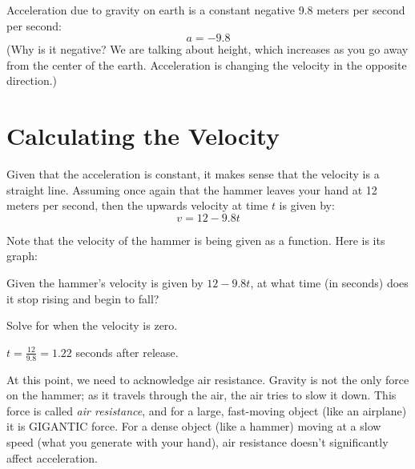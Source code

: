 Acceleration due to gravity on earth is a constant negative 9.8 meters per second per second:
\begin{equation*}
a = -9.8   
\end{equation*}
(Why is it negative? We are talking about height, which increases as
you go away from the center of the earth. Acceleration is changing the
velocity in the opposite direction.)

\section{Calculating the Velocity}

Given that the acceleration is constant, it makes sense that the
velocity is a straight line. Assuming once again that the hammer
leaves your hand at 12 meters per second, then the upwards velocity at
time $t$ is given by:
\begin{equation*}
  v = 12 - 9.8t
\end{equation*}

Note that the velocity of the hammer is being given as a function. Here is its graph:


\begin{Exercise}[title={When is the apex of flight?}, label=vapex]
  Given the hammer's velocity is given by $12 - 9.8t$, at what time (in seconds)
  does it stop rising and begin to fall?
\end{Exercise}
\begin{Answer}[ref=vapex]
  Solve for when the velocity is zero.

  $t = \frac{12}{9.8} = 1.22$ seconds after release.
\end{Answer}

At this point, we need to acknowledge air resistance. Gravity
is not the only force on the hammer; as it travels through the air,
the air tries to slow it down. This force is called \emph{air resistance},
and for a large, fast-moving object (like an airplane) it is GIGANTIC force. For a
dense object (like a hammer) moving at a slow speed (what you generate
with your hand), air resistance doesn't significantly affect acceleration.

